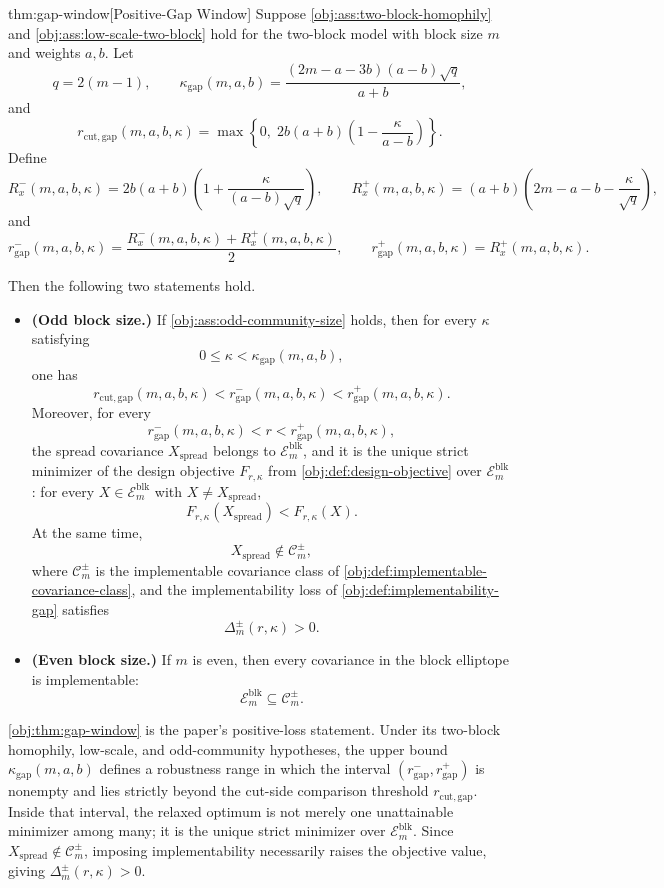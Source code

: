 \begin{theoremv}{thm:gap-window}[Positive-Gap Window]
Suppose \cref{obj:ass:two-block-homophily} and \cref{obj:ass:low-scale-two-block} hold for the two-block model with block size \(m\) and weights \(a,b\). Let
\[
q=2(m-1),\qquad
\kappa_{\mathrm{gap}}(m,a,b)
=
\frac{(2m-a-3b)(a-b)\sqrt q}{a+b},
\]
and
\[
r_{\mathrm{cut,gap}}(m,a,b,\kappa)
=
\max\left\{0,\;2b(a+b)\left(1-\frac{\kappa}{a-b}\right)\right\}.
\]
Define
\[
R_x^-(m,a,b,\kappa)
=
2b(a+b)\left(1+\frac{\kappa}{(a-b)\sqrt q}\right),
\qquad
R_x^+(m,a,b,\kappa)
=
(a+b)\left(2m-a-b-\frac{\kappa}{\sqrt q}\right),
\]
and
\[
r_{\mathrm{gap}}^-(m,a,b,\kappa)
=
\frac{R_x^-(m,a,b,\kappa)+R_x^+(m,a,b,\kappa)}{2},
\qquad
r_{\mathrm{gap}}^+(m,a,b,\kappa)
=
R_x^+(m,a,b,\kappa).
\]

Then the following two statements hold.
\begin{itemize}
\item \textbf{(Odd block size.)} If \cref{obj:ass:odd-community-size} holds, then for every \(\kappa\) satisfying
\[
0\le \kappa < \kappa_{\mathrm{gap}}(m,a,b),
\]
one has
\[
r_{\mathrm{cut,gap}}(m,a,b,\kappa)
<
r_{\mathrm{gap}}^-(m,a,b,\kappa)
<
r_{\mathrm{gap}}^+(m,a,b,\kappa).
\]
Moreover, for every
\[
r_{\mathrm{gap}}^-(m,a,b,\kappa)
<
r
<
r_{\mathrm{gap}}^+(m,a,b,\kappa),
\]
the spread covariance \(X_{\mathrm{spread}}\) belongs to \(\mathcal E_m^{\mathrm{blk}}\), and it is the unique strict minimizer of the design objective \(F_{r,\kappa}\) from \cref{obj:def:design-objective} over \(\mathcal E_m^{\mathrm{blk}}\): for every \(X\in \mathcal E_m^{\mathrm{blk}}\) with \(X\ne X_{\mathrm{spread}}\),
\[
F_{r,\kappa}(X_{\mathrm{spread}})<F_{r,\kappa}(X).
\]
At the same time,
\[
X_{\mathrm{spread}}\notin \mathcal C_m^{\pm},
\]
where \(\mathcal C_m^{\pm}\) is the implementable covariance class of \cref{obj:def:implementable-covariance-class}, and the implementability loss of \cref{obj:def:implementability-gap} satisfies
\[
\Delta_m^{\pm}(r,\kappa)>0.
\]

\item \textbf{(Even block size.)} If \(m\) is even, then every covariance in the block elliptope is implementable:
\[
\mathcal E_m^{\mathrm{blk}}\subseteq \mathcal C_m^{\pm}.
\]
\end{itemize}
\end{theoremv}

\cref{obj:thm:gap-window} is the paper's positive-loss statement. Under its two-block homophily, low-scale, and odd-community hypotheses, the upper bound \(\kappa_{\mathrm{gap}}(m,a,b)\) defines a robustness range in which the interval \((r_{\mathrm{gap}}^-,r_{\mathrm{gap}}^+)\) is nonempty and lies strictly beyond the cut-side comparison threshold \(r_{\mathrm{cut,gap}}\). Inside that interval, the relaxed optimum is not merely one unattainable minimizer among many; it is the unique strict minimizer over \(\mathcal E_m^{\mathrm{blk}}\). Since \(X_{\mathrm{spread}}\notin\mathcal C_m^{\pm}\), imposing implementability necessarily raises the objective value, giving \(\Delta_m^{\pm}(r,\kappa)>0\).

